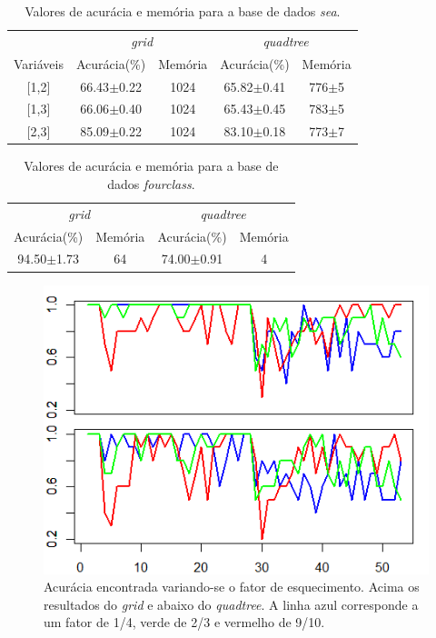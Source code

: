 \documentclass[conference]{IEEEtran}
\begin{document}
\begin{table}[h]
\caption{Valores de acurácia e memória para a base de dados \textit{sea}.}
\tabcolsep=0.2cm
\begin{center}
\begin{tabular}{@{}ccccc@{}}
\hline
 & \multicolumn{2}{c}{\textit{grid}} & \multicolumn{2}{c}{\textit{quadtree}} \\
Variáveis & Acurácia(\%) & Memória & Acurácia(\%) & Memória \\ \hline
{[}1,2{]} & 66.43$\pm$0.22 & 1024 & 65.82$\pm$0.41 & 776$\pm$5 \\
{[}1,3{]} & 66.06$\pm$0.40 & 1024 & 65.43$\pm$0.45 & 783$\pm$5 \\
{[}2,3{]} & 85.09$\pm$0.22 & 1024 & 83.10$\pm$0.18 & 773$\pm$7 \\ \hline
\end{tabular}
\label{tabsea}
\end{center}
\end{table}

\begin{table}[h]
\caption{Valores de acurácia e memória para a base de dados \textit{fourclass}.}
\tabcolsep=0.2cm
\begin{center}
\begin{tabular}{@{}cccc@{}}
\hline
\multicolumn{2}{c}{\textit{grid}} & \multicolumn{2}{c}{\textit{quadtree}} \\
Acurácia(\%) & Memória & Acurácia(\%) & Memória \\ \hline
94.50$\pm$1.73 & 64 & 74.00$\pm$0.91 & 4 \\ \hline
\end{tabular}
\label{tabfour}
\end{center}
\end{table}



\begin{figure}[!h]
\centerline{\includegraphics[width=0.9\columnwidth]{fig/acc_forg.png}}
\caption{Acurácia encontrada variando-se o fator de esquecimento. Acima os resultados do \textit{grid} e abaixo do \textit{quadtree}. A linha azul corresponde a um fator de 1/4, verde de 2/3 e vermelho de 9/10.}
\label{accforg}
\end{figure}
\end{document}
